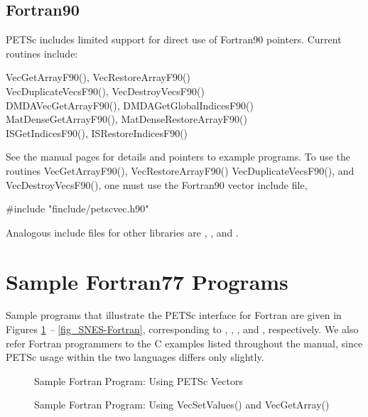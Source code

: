 \subsection{Fortran90}

PETSc includes limited support for direct use of Fortran90 pointers.
Current routines include:
\begin{tabbing}
 VecGetArrayF90(), VecRestoreArrayF90()\\
 VecDuplicateVecsF90(), VecDestroyVecsF90()\\
 DMDAVecGetArrayF90(), DMDAGetGlobalIndicesF90()\\
 MatDenseGetArrayF90(), MatDenseRestoreArrayF90()\\
 ISGetIndicesF90(), ISRestoreIndicesF90()
\end{tabbing}
See the manual pages for details and pointers to example programs.  To
use the routines VecGetArrayF90(), VecRestoreArrayF90()
VecDuplicateVecsF90(), and VecDestroyVecsF90(), one must
use the Fortran90 vector include file,
\begin{tabbing}
    \#include "finclude/petscvec.h90"
\end{tabbing}
Analogous include files for other libraries are ,
, and .

\section{Sample Fortran77 Programs}
\label{sec_fortran-examples}

Sample programs that illustrate the PETSc interface for Fortran
are given in Figures \ref{fig_vec-Fortran} {\em --} \ref{fig_SNES-Fortran},
corresponding to
,
,
\break {}, and
, respectively.  We also
refer Fortran programmers to the C examples listed throughout the manual,
since PETSc usage within the two languages differs only slightly.

\begin{figure}[H]
{\small
{}
}
\caption{Sample Fortran Program:  Using PETSc Vectors}
\label{fig_vec-Fortran}
\end{figure}

\begin{figure}[H]
{\small
{}
}
\caption{Sample Fortran Program:  Using VecSetValues() and VecGetArray()}
\label{fig_vec2-Fortran}
\end{figure}

